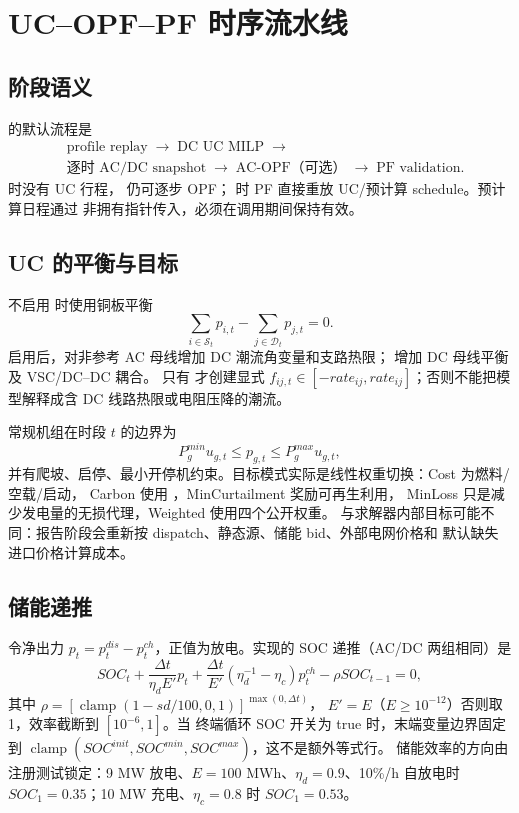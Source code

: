 \section{UC--OPF--PF 时序流水线}
\label{sec:tspf-pipeline}

\subsection{阶段语义}
 的默认流程是
\[
\begin{aligned}
  &\text{profile replay}\;\longrightarrow\;\text{DC UC MILP}\;\longrightarrow\\
  &\text{逐时 AC/DC snapshot}\;\longrightarrow\;\text{AC-OPF（可选）}\;\longrightarrow\;\text{PF validation}.
\end{aligned}
\]
 时没有 UC 行程， 仍可逐步 OPF；
 时 PF 直接重放 UC/预计算 schedule。预计算日程通过
 非拥有指针传入，必须在调用期间保持有效。

\subsection{UC 的平衡与目标}
不启用  时使用铜板平衡
\[
 \sum_{i\in\mathcal S_t}p_{i,t}-\sum_{j\in\mathcal D_t}p_{j,t}=0.
\]
启用后，对非参考 AC 母线增加 DC 潮流角变量和支路热限；
 增加 DC 母线平衡及 VSC/DC--DC 耦合。
只有  才创建显式
$f_{ij,t}\in[-rate_{ij},rate_{ij}]$；否则不能把模型解释成含 DC 线路热限或电阻压降的潮流。

常规机组在时段 $t$ 的边界为
\[
 P_g^{min}u_{g,t}\le p_{g,t}\le P_g^{max}u_{g,t},
\]
并有爬坡、启停、最小开停机约束。目标模式实际是线性权重切换：Cost 为燃料/空载/启动，
Carbon 使用 ，MinCurtailment 奖励可再生利用，
MinLoss 只是减少发电量的无损代理，Weighted 使用四个公开权重。
与求解器内部目标可能不同：报告阶段会重新按 dispatch、静态源、储能 bid、外部电网价格和
默认缺失进口价格计算成本。

\subsection{储能递推}
令净出力 $p_t=p_t^{dis}-p_t^{ch}$，正值为放电。实现的 SOC 递推（AC/DC 两组相同）是
\[
 SOC_t+\frac{\Delta t}{\eta_dE'}p_t
 +\frac{\Delta t}{E'}(\eta_d^{-1}-\eta_c)p_t^{ch}
 -\rho SOC_{t-1}=0,
\]
其中 $\rho=[\operatorname{clamp}(1-sd/100,0,1)]^{\max(0,\Delta t)}$，
$E'=E$（$E\ge10^{-12}$）否则取 1，效率截断到 $[10^{-6},1]$。当
终端循环 SOC 开关为 true 时，末端变量边界固定到
$\operatorname{clamp}(SOC^{init},SOC^{min},SOC^{max})$，这不是额外等式行。
储能效率的方向由注册测试锁定：9 MW 放电、$E=100$ MWh、$\eta_d=0.9$、10\%/h 自放电时
$SOC_1=0.35$；10 MW 充电、$\eta_c=0.8$ 时 $SOC_1=0.53$。

